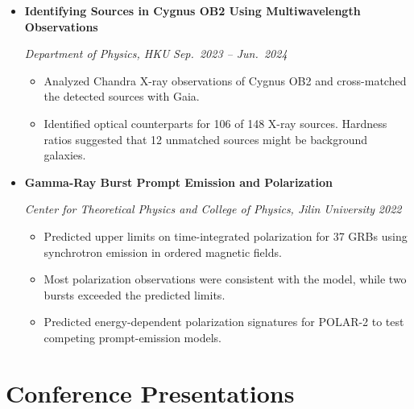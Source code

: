 \documentclass[letterpaper,11pt]{article}
\newlength{\cvEntryGap}
\newenvironment{cvEntries}{%
    \begin{itemize}[
        label={},
        leftmargin=0.15in,
        rightmargin=0pt,
        topsep=0pt,
        partopsep=0pt,
        parsep=0pt,
        itemsep=\cvEntryGap
    ]
}{%
    \end{itemize}
}
\newenvironment{cvBullets}{%
    \begin{itemize}[
        label=\textbullet,
        leftmargin=1.65em,
        topsep=2pt,
        partopsep=0pt,
        parsep=0pt,
        itemsep=2.5pt
    ]
    \small
}{%
    \end{itemize}
}
\newcommand{\cvOrg}[1]{%
    {\small\itshape #1}%
}
\newcommand{\researchEntry}[3]{%
    \item
    \needspace{5\baselineskip}
    \textbf{#1}\par
    \cvOrg{#2}\hfill{\small\itshape #3}\par
}
\begin{document}
\begin{cvEntries}
\begin{cvBullets}
    \end{cvBullets}


    \researchEntry
    {Identifying Sources in Cygnus OB2
    Using Multiwavelength Observations}
    {Department of Physics, HKU}
    {Sep.\ 2023 -- Jun.\ 2024}

    \begin{cvBullets}

        \item
        Analyzed Chandra X-ray observations
        of Cygnus OB2 and cross-matched
        the detected sources with Gaia.

        \item
        Identified optical counterparts for
        106 of 148 X-ray sources.
        Hardness ratios suggested that
        12 unmatched sources might be
        background galaxies.

    \end{cvBullets}


    \researchEntry
    {Gamma-Ray Burst Prompt Emission
    and Polarization}
    {Center for Theoretical Physics and
    College of Physics, Jilin University}
    {2022}

    \begin{cvBullets}

        \item
        Predicted upper limits on time-integrated
        polarization for 37 GRBs using synchrotron
        emission in ordered magnetic fields.

        \item
        Most polarization observations were
        consistent with the model, while two
        bursts exceeded the predicted limits.

        \item
        Predicted energy-dependent polarization
        signatures for POLAR-2 to test competing
        prompt-emission models.

    \end{cvBullets}

\end{cvEntries}


\section{Conference Presentations}
\end{document}
